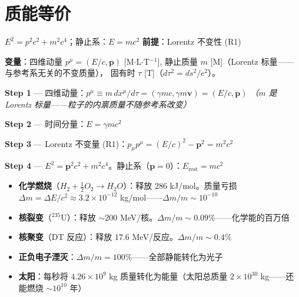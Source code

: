 \section{质能等价}

\begin{lawbox}[质能等价]
  $E^2 = p^2c^2 + m^2c^4$；静止系：$E = mc^2$
  \quad\textbf{前提}：Lorentz 不变性 (R1)
\end{lawbox}

\noindent\textbf{变量}：四维动量 $p^\mu = (E/c, \mathbf{p})$ [M$\cdot$L$\cdot$T$^{-1}$],
静止质量 $m$ [M]（Lorentz 标量——与参考系无关的不变质量），
固有时 $\tau$ [T]（$d\tau^2 = ds^2/c^2$）。

\begin{derivationbox}[推导]
  \textbf{Step 1} — 四维动量：$p^\mu \equiv m\,dx^\mu/d\tau = (\gamma mc, \gamma m\mathbf{v}) = (E/c, \mathbf{p})$
  \hfill\textit{（$m$ 是 Lorentz 标量——粒子的内禀质量不随参考系改变）}

  \textbf{Step 2} — 时间分量：$E = \gamma mc^2$

  \textbf{Step 3} — Lorentz 不变量 (R1)：$p_\mu p^\mu = (E/c)^2 - \mathbf{p}^2 = m^2c^2$

  \textbf{Step 4} — $E^2 = \mathbf{p}^2c^2 + m^2c^4$。静止系（$\mathbf{p}=0$）：$E_{\text{rest}} = mc^2$
\end{derivationbox}


\begin{oombox}[$E=mc^2$ 的实际转换效率]
  \begin{itemize}
    \item \textbf{化学燃烧}（$H_2 + \frac{1}{2}O_2 \to H_2O$）：释放 $286$ kJ/mol。质量亏损 $\Delta m = \Delta E/c^2 \approx 3.2\times 10^{-12}$ kg/mol——$\Delta m/m \sim 10^{-10}$
    \item \textbf{核裂变}（$^{235}$U）：释放 $\sim 200$ MeV/核。$\Delta m/m \sim 0.09\%$——化学能的百万倍
    \item \textbf{核聚变}（DT 反应）：释放 $17.6$ MeV/反应。$\Delta m/m \sim 0.4\%$
    \item \textbf{正负电子湮灭}：$\Delta m/m = 100\%$——全部静能转化为光子
    \item \textbf{太阳}：每秒将 $4.26\times 10^9$ kg 质量转化为能量（太阳总质量 $2\times 10^{30}$ kg——还能燃烧 $\sim 10^{10}$ 年）
  \end{itemize}
\end{oombox}

